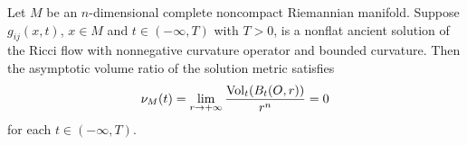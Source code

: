 \begin{lemma} 
  \label{lem:cz-ancient-solution-asymptotic-volume-ratio-zero}

Let $M$ be an $n$-dimensional complete noncompact Riemannian
manifold. Suppose $g_{ij}(x,t)$, $x\in M$ and $t\in(-\infty,T)$
with $T>0$, is a nonflat ancient solution of the Ricci flow with
nonnegative curvature operator and bounded curvature. Then the
asymptotic volume ratio of the solution metric satisfies
$$
\nu_M(t)=\lim_{r\rightarrow+\infty}\frac{\operatorname{Vol}_t(B_t(O,r))}{r^n}=0
$$
for each $t\in(-\infty,T)$.
\end{lemma}

